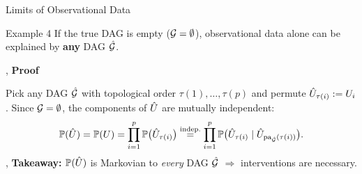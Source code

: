 \begin{frame}{Limits of Observational Data}
  \vspace{1ex}
  \begin{statement}{Example 4}
    If the true DAG is empty ($\mathcal{G} = \emptyset$), observational data alone can be explained by \textbf{any} DAG $\hat{\mathcal{G}}$.
  \end{statement}
  \sep
  \textbf{Proof}\par
  Pick any DAG $\hat{\mathcal{G}}$ with topological order $\tau(1),\dots,\tau(p)$ and permute $\hat{U}_{\tau(i)} := U_i$. Since $\mathcal{G} = \emptyset$, the components of $\hat{U}$ are mutually independent:
  \[
    \mathbb{P}(\hat{U}) = \mathbb{P}(U) = \prod_{i=1}^p \mathbb{P}\big(\hat{U}_{\tau(i)}\big)
    \overset{\text{indep.}}{=} \prod_{i=1}^p \mathbb{P}\big(\hat{U}_{\tau(i)} \mid \hat{U}_{\operatorname{pa}_{\hat{\mathcal{G}}}(\tau(i))}\big).
  \]
  \sep
  \textbf{Takeaway:} $\mathbb{P}(\hat{U})$ is Markovian to \emph{every} DAG $\hat{\mathcal{G}}$ $\Longrightarrow$ interventions are necessary.
\end{frame}

